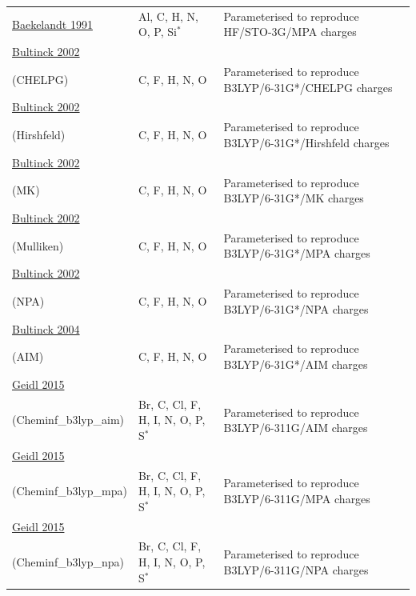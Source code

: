 \documentclass[oneside]{memoir}
\begin{document}
\begin{longtable}{p{4cm} p{3.3cm} p{8cm}}
\addlinespace[5pt] \href{https://doi.org/10.1021/ja00018a003}{Baekelandt 1991} & Al, C, H, N, O, P, Si$^{*}$ & Parameterised to reproduce HF/STO-3G/MPA charges \\
\addlinespace[5pt]\midrule\addlinespace[5pt] \href{https://doi.org/10.1021/jp020547v}{Bultinck 2002}\\(CHELPG) & C, F, H, N, O & Parameterised to reproduce B3LYP/6-31G*/CHELPG charges \\
\addlinespace[5pt]\midrule\addlinespace[5pt] \href{https://doi.org/10.1021/jp020547v}{Bultinck 2002}\\(Hirshfeld) & C, F, H, N, O & Parameterised to reproduce B3LYP/6-31G*/Hirshfeld charges \\
\addlinespace[5pt]\midrule\addlinespace[5pt] \href{https://doi.org/10.1021/jp020547v}{Bultinck 2002}\\(MK) & C, F, H, N, O & Parameterised to reproduce B3LYP/6-31G*/MK charges \\
\addlinespace[5pt]\midrule\addlinespace[5pt] \href{https://doi.org/10.1021/jp020547v}{Bultinck 2002}\\(Mulliken) & C, F, H, N, O & Parameterised to reproduce B3LYP/6-31G*/MPA charges \\
\addlinespace[5pt] \href{https://doi.org/10.1021/jp020547v}{Bultinck 2002}\\(NPA) & C, F, H, N, O & Parameterised to reproduce B3LYP/6-31G*/NPA charges \\
\addlinespace[5pt]\midrule\addlinespace[5pt] \href{https://doi.org/10.1021/jp046928l}{Bultinck 2004}\\(AIM) & C, F, H, N, O & Parameterised to reproduce B3LYP/6-31G*/AIM charges \\
\addlinespace[5pt]\midrule\addlinespace[5pt] \href{https://doi.org/10.1186/s13321-015-0107-1}{Geidl 2015}\\(Cheminf\_b3lyp\_aim) & Br, C, Cl, F, H, I, N, O, P, S$^{*}$ & Parameterised to reproduce B3LYP/6-311G/AIM charges \\
\addlinespace[5pt]\midrule\addlinespace[5pt] \href{https://doi.org/10.1186/s13321-015-0107-1}{Geidl 2015}\\(Cheminf\_b3lyp\_mpa) & Br, C, Cl, F, H, I, N, O, P, S$^{*}$ & Parameterised to reproduce B3LYP/6-311G/MPA charges \\
\addlinespace[5pt]\midrule\addlinespace[5pt] \href{https://doi.org/10.1186/s13321-015-0107-1}{Geidl 2015}\\(Cheminf\_b3lyp\_npa) & Br, C, Cl, F, H, I, N, O, P, S$^{*}$ & Parameterised to reproduce B3LYP/6-311G/NPA charges \\

\end{longtable}
\end{document}
